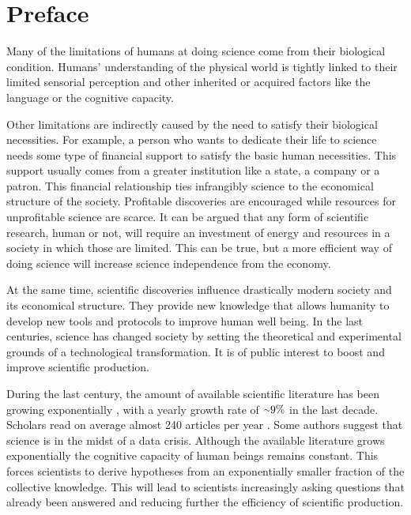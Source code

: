 \documentclass[11pt,a4paper,twoside]{report}
\newcommand{\+}{\textnormal{+} }
\theoremstyle{definition}
\numberwithin{equation}{chapter}
\begin{document}
\chapter*{Preface} 

Many of the limitations of humans at doing science come from their biological
condition. Humans' understanding of the physical world is tightly linked to
their limited sensorial perception and other inherited or acquired 
factors like the language or the cognitive capacity.

Other limitations are indirectly caused by the need to satisfy their biological
necessities. For example, a person who wants to dedicate their life to science
needs some type of financial support to satisfy the basic human necessities.
This support usually comes from a greater institution like a state, a company or
a patron. This financial relationship ties infrangibly science to the economical
structure of the society. Profitable discoveries are encouraged while resources
for unprofitable science are scarce. It can be argued that any form of
scientific research, human or not, will require an investment of energy and
resources in a society in which those are limited. This can be true, but a more
efficient way of doing science will increase science independence from the
economy. 

At the same time, scientific discoveries influence drastically modern society
and its economical structure. They provide new knowledge that allows humanity to
develop new tools and protocols to improve human well being. In the last
centuries, science has changed society by setting the theoretical and
experimental grounds of a technological transformation. It is of public interest
to boost and improve scientific production.

During the last century, the amount of available scientific literature has been
growing exponentially \cite{sinatra2015century,BornmannRudiger}, with a yearly
growth rate of $ {\raise.17ex\hbox{$\scriptstyle\mathtt{\sim}$}} 9\%$ in the
last decade. Scholars read on average almost 240 articles per year
\cite{publications7010018}. Some authors \cite{Alkhateeb} suggest that science
is in the midst of a data crisis. Although the available literature grows
exponentially the cognitive capacity of human beings remains constant. This
forces scientists to derive hypotheses from an exponentially smaller fraction of
the collective knowledge. This will lead to scientists increasingly asking
questions that already been answered and reducing further the efficiency of
scientific production. 
\end{document}

